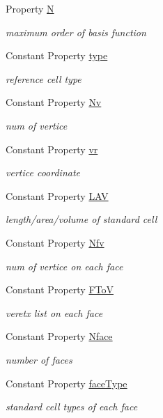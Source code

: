 \begin{DoxyCompactItemize}
\item 
Property \hyperlink{class_std_cell_a8df35ad5169af36d3dff62644f7878c9}{N}
\begin{DoxyCompactList}\small\item\em maximum order of basis function \end{DoxyCompactList}\item 
Constant Property \hyperlink{class_std_cell_a4c1a38abb723d751ade8f70de3635f01}{type}
\begin{DoxyCompactList}\small\item\em reference cell type \end{DoxyCompactList}\item 
Constant Property \hyperlink{class_std_cell_aa9184c7d3310ebc082f914a8358e786c}{Nv}
\begin{DoxyCompactList}\small\item\em num of vertice \end{DoxyCompactList}\item 
Constant Property \hyperlink{class_std_cell_a8da4e282eb7aa3d20cac040f3fac3b96}{vr}
\begin{DoxyCompactList}\small\item\em vertice coordinate \end{DoxyCompactList}\item 
Constant Property \hyperlink{class_std_cell_ac65d1d344b5178efb58c7133cf939b7f}{L\+AV}
\begin{DoxyCompactList}\small\item\em length/area/volume of standard cell \end{DoxyCompactList}\item 
Constant Property \hyperlink{class_std_cell_a32ea0a46ccb1beecc6c377b632b4b61c}{Nfv}
\begin{DoxyCompactList}\small\item\em num of vertice on each face \end{DoxyCompactList}\item 
Constant Property \hyperlink{class_std_cell_a53b999c063d4d2c88b3910990ef3a648}{F\+ToV}
\begin{DoxyCompactList}\small\item\em veretx list on each face \end{DoxyCompactList}\item 
Constant Property \hyperlink{class_std_cell_a5961e35408813e3a3849eff83588f86e}{Nface}
\begin{DoxyCompactList}\small\item\em number of faces \end{DoxyCompactList}\item 
Constant Property \hyperlink{class_std_cell_ac8c8923153477b3ec9f35646fc54a881}{face\+Type}
\begin{DoxyCompactList}\small\item\em standard cell types of each face \end{DoxyCompactList}\end{DoxyCompactItemize}
